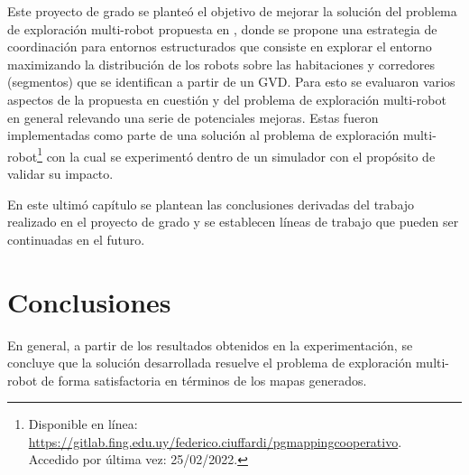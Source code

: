 Este proyecto de grado se planteó el objetivo de mejorar la solución del
problema de exploración multi-robot propuesta en \cite{wurm2008coordinated},
donde se propone una estrategia de coordinación para entornos estructurados
que consiste en explorar el entorno maximizando la distribución de los robots sobre las
habitaciones y corredores (segmentos) que se identifican a partir de un
GVD. Para esto se evaluaron varios aspectos de la propuesta en cuestión y del
problema de exploración multi-robot en general relevando una serie de
potenciales mejoras. Estas fueron implementadas como parte de una solución al
problema de exploración multi-robot\footnote{Disponible en línea:\\
\url{https://gitlab.fing.edu.uy/federico.ciuffardi/pgmappingcooperativo}.\\Accedido por última vez: 25/02/2022.} con
la cual se experimentó dentro de un simulador con el propósito de validar su
impacto.

En este ultimó capítulo se plantean las conclusiones derivadas del trabajo
realizado en el proyecto de grado y se establecen líneas de trabajo que pueden ser
continuadas en el futuro.

\section{Conclusiones}


En general, a partir de los resultados obtenidos en la experimentación, se
concluye que la solución desarrollada resuelve el problema de exploración
multi-robot de forma satisfactoria en términos de los mapas generados. 

